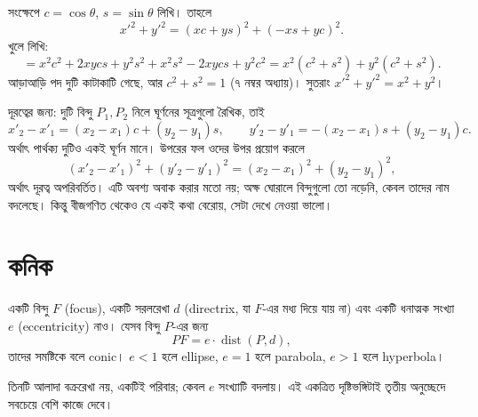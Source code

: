 \documentclass[11pt]{article}
\begin{document}
\begin{sol}
সংক্ষেপে $c = \cos\theta$, $s = \sin\theta$ লিখি। তাহলে
\[
  x'^{2} + y'^{2} = (xc+ys)^{2} + (-xs+yc)^{2} .
\]
খুলে লিখি:
\[
  = x^{2}c^{2} + 2xycs + y^{2}s^{2} + x^{2}s^{2} - 2xycs + y^{2}c^{2}
  = x^{2}(c^{2}+s^{2}) + y^{2}(c^{2}+s^{2}) .
\]
আড়াআড়ি পদ দুটি কাটাকাটি গেছে, আর $c^{2}+s^{2} = 1$ (৭ নম্বর অধ্যায়)।
সুতরাং $x'^{2}+y'^{2} = x^{2}+y^{2}$।

দূরত্বের জন্য: দুটি বিন্দু $P_{1}, P_{2}$ নিলে ঘূর্ণনের সূত্রগুলো রৈখিক, তাই
\[
  x'_{2} - x'_{1} = (x_{2}-x_{1})c + (y_{2}-y_{1})s, \qquad
  y'_{2} - y'_{1} = -(x_{2}-x_{1})s + (y_{2}-y_{1})c .
\]
অর্থাৎ পার্থক্য দুটিও একই ঘূর্ণন মানে। উপরের ফল ওদের উপর প্রয়োগ করলে
\[
  (x'_{2}-x'_{1})^{2} + (y'_{2}-y'_{1})^{2} = (x_{2}-x_{1})^{2} + (y_{2}-y_{1})^{2} ,
\]
অর্থাৎ দূরত্ব অপরিবর্তিত। এটি অবশ্য অবাক করার মতো নয়; অক্ষ ঘোরালে বিন্দুগুলো তো
নড়েনি, কেবল তাদের নাম বদলেছে। কিন্তু বীজগণিত থেকেও যে একই কথা বেরোয়, সেটা
দেখে নেওয়া ভালো।
\end{sol}

\section{কনিক}

\begin{idea}
একটি বিন্দু $F$ (focus), একটি সরলরেখা $d$ (directrix, যা $F$-এর মধ্য দিয়ে যায়
না) এবং একটি ধনাত্মক সংখ্যা $e$ (eccentricity) নাও। যেসব বিন্দু $P$-এর জন্য
\[
  PF = e \cdot \operatorname{dist}(P, d) ,
\]
তাদের সমষ্টিকে বলে conic। $e < 1$ হলে ellipse, $e = 1$ হলে parabola, $e > 1$
হলে hyperbola।
\end{idea}

তিনটি আলাদা বক্ররেখা নয়, একটিই পরিবার; কেবল $e$ সংখ্যাটি বদলায়। এই একত্রিত
দৃষ্টিভঙ্গিটাই তৃতীয় অনুচ্ছেদে সবচেয়ে বেশি কাজে দেবে।
\end{document}

